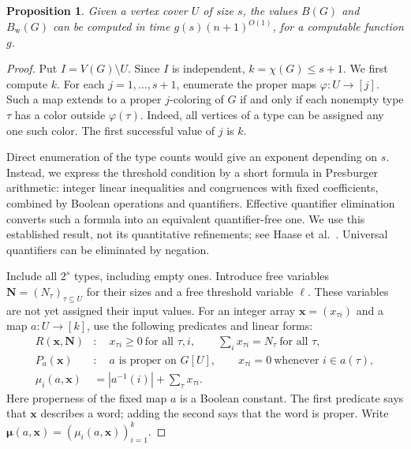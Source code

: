 \documentclass[10pt,a4paper]{amsart}
\numberwithin{equation}{section}
\newtheorem{proposition}[theorem]{Proposition}
\theoremstyle{definition}
\theoremstyle{remark}
\begin{document}
\begin{proposition}\label{rec:cover}
Given a vertex cover $U$ of size $s$, the values $B(G)$ and $B_{\mathrm w}(G)$
can be computed in time $g(s)(n+1)^{O(1)}$, for a computable function $g$.
\end{proposition}
\begin{proof}
Put $I=V(G)\setminus U$. Since $I$ is independent,
$k=\chi(G)\leq s+1$. We first compute $k$. For each
$j=1,\ldots,s+1$, enumerate the proper maps $\varphi:U\to[j]$.
Such a map extends to a proper $j$-coloring of $G$ if and only if
each nonempty type $\tau$ has a color outside $\varphi(\tau)$.
Indeed, all vertices of a type can be assigned any one such color.
The first successful value of $j$ is $k$.

Direct enumeration of the type counts would give an exponent depending
on $s$. Instead, we express the threshold condition by a short formula
in Presburger arithmetic: integer linear inequalities and congruences
with fixed coefficients, combined by Boolean operations and quantifiers.
Effective quantifier elimination converts such a formula into an
equivalent quantifier-free one. We use this established result, not
its quantitative refinements; see Haase et al.~\cite[Corollary~3.2]{haase2024}.
Universal quantifiers can be eliminated by negation.

Include all $2^s$ types, including empty ones. Introduce free variables
$\mathbf N=(N_\tau)_{\tau\subseteq U}$ for their sizes and a free
threshold variable $\ell$. These variables are not yet assigned their
input values. For an integer array $\mathbf x=(x_{\tau i})$ and a
map $a:U\to[k]$, use the following predicates and linear forms:
\[
\begin{aligned}
R(\mathbf x,\mathbf N)
&:\quad x_{\tau i}\geq0\ \text{for all }\tau,i,\qquad
          \sum_i x_{\tau i}=N_\tau\ \text{for all }\tau,\\
P_a(\mathbf x)
&:\quad a\text{ is proper on }G[U],\qquad
          x_{\tau i}=0\ \text{whenever }i\in a(\tau),\\
\mu_i(a,\mathbf x)&=|a^{-1}(i)|+\sum_\tau x_{\tau i}.
\end{aligned}
\]
Here properness of the fixed map $a$ is a Boolean constant.
The first predicate says that $\mathbf x$ describes a word; adding
the second says that the word is proper. Write
$\boldsymbol\mu(a,\mathbf x)=(\mu_i(a,\mathbf x))_{i=1}^k$.


\end{proof}
\end{document}
